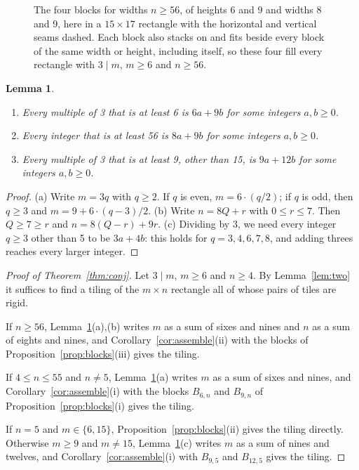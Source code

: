 \documentclass[11pt]{article}
\newtheorem{lemma}[theorem]{Lemma}
\theoremstyle{definition}
\theoremstyle{remark}
\begin{document}
\begin{figure}[ht]
\caption{The four blocks for widths $n\ge56$, of heights 6 and 9 and widths
8 and 9, here in a $15\times17$ rectangle with the horizontal and vertical
seams dashed. Each block also stacks on and fits beside every block of the
same width or height, including itself, so these four fill every
rectangle with $3\mid m$, $m\ge6$ and $n\ge56$.}
\label{fig:palette}
\end{figure}

\begin{lemma}\label{lem:arith}
\begin{enumerate}
\item[(a)] Every multiple of 3 that is at least 6 is $6a+9b$ for some
integers $a,b\ge0$.
\item[(b)] Every integer that is at least 56 is $8a+9b$ for some integers
$a,b\ge0$.
\item[(c)] Every multiple of 3 that is at least 9, other than 15, is
$9a+12b$ for some integers $a,b\ge0$.
\end{enumerate}
\end{lemma}

\begin{proof}
(a) Write $m=3q$ with $q\ge2$. If $q$ is even, $m=6\cdot(q/2)$; if $q$ is
odd, then $q\ge3$ and $m=9+6\cdot(q-3)/2$. (b) Write $n=8Q+r$ with
$0\le r\le7$. Then $Q\ge7\ge r$ and $n=8(Q-r)+9r$. (c) Dividing by 3, we
need every integer $q\ge3$ other than 5 to be $3a+4b$: this holds for
$q=3,4,6,7,8$, and adding threes reaches every larger integer.
\end{proof}

\begin{proof}[Proof of Theorem~\ref{thm:conj}]
Let $3\mid m$, $m\ge6$ and $n\ge4$. By Lemma~\ref{lem:two} it suffices to
find a tiling of the $m\times n$ rectangle all of whose pairs of tiles are
rigid.

If $n\ge56$, Lemma~\ref{lem:arith}(a),(b) writes $m$ as a sum of sixes and
nines and $n$ as a sum of eights and nines, and Corollary~\ref{cor:assemble}(ii)
with the blocks of Proposition~\ref{prop:blocks}(iii) gives the tiling.

If $4\le n\le55$ and $n\ne5$, Lemma~\ref{lem:arith}(a) writes $m$ as a sum
of sixes and nines, and Corollary~\ref{cor:assemble}(i) with the blocks
$B_{6,n}$ and $B_{9,n}$ of Proposition~\ref{prop:blocks}(i) gives the tiling.

If $n=5$ and $m\in\{6,15\}$, Proposition~\ref{prop:blocks}(ii) gives the
tiling directly. Otherwise $m\ge9$ and $m\ne15$, Lemma~\ref{lem:arith}(c)
writes $m$ as a sum of nines and twelves, and Corollary~\ref{cor:assemble}(i)
with $B_{9,5}$ and $B_{12,5}$ gives the tiling.
\end{proof}
\end{document}
